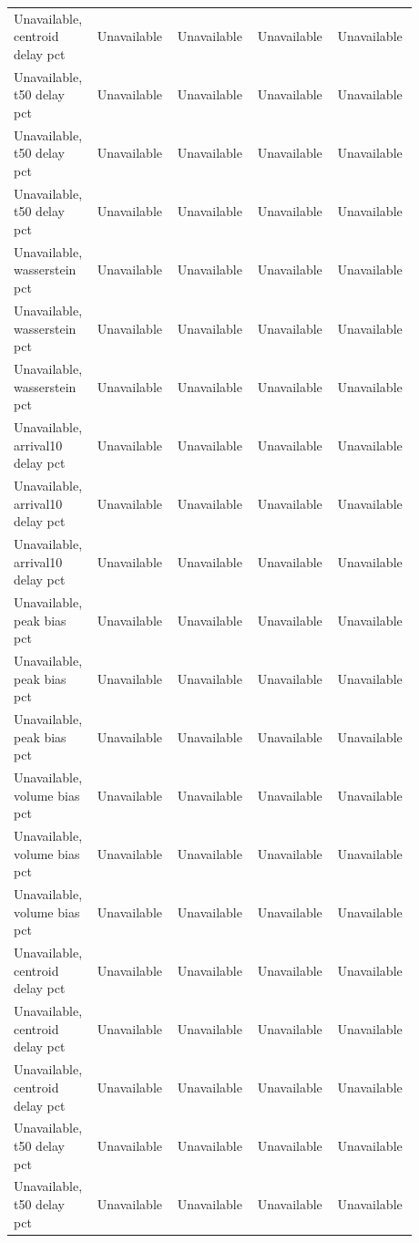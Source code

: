 \begin{longtable}{p{0.1760\linewidth}p{0.1760\linewidth}p{0.1760\linewidth}p{0.1760\linewidth}p{0.1760\linewidth}}
Unavailable, centroid delay pct & Unavailable & Unavailable & Unavailable & Unavailable \\
Unavailable, t50 delay pct & Unavailable & Unavailable & Unavailable & Unavailable \\
Unavailable, t50 delay pct & Unavailable & Unavailable & Unavailable & Unavailable \\
Unavailable, t50 delay pct & Unavailable & Unavailable & Unavailable & Unavailable \\
Unavailable, wasserstein pct & Unavailable & Unavailable & Unavailable & Unavailable \\
Unavailable, wasserstein pct & Unavailable & Unavailable & Unavailable & Unavailable \\
Unavailable, wasserstein pct & Unavailable & Unavailable & Unavailable & Unavailable \\
Unavailable, arrival10 delay pct & Unavailable & Unavailable & Unavailable & Unavailable \\
Unavailable, arrival10 delay pct & Unavailable & Unavailable & Unavailable & Unavailable \\
Unavailable, arrival10 delay pct & Unavailable & Unavailable & Unavailable & Unavailable \\
Unavailable, peak bias pct & Unavailable & Unavailable & Unavailable & Unavailable \\
Unavailable, peak bias pct & Unavailable & Unavailable & Unavailable & Unavailable \\
Unavailable, peak bias pct & Unavailable & Unavailable & Unavailable & Unavailable \\
Unavailable, volume bias pct & Unavailable & Unavailable & Unavailable & Unavailable \\
Unavailable, volume bias pct & Unavailable & Unavailable & Unavailable & Unavailable \\
Unavailable, volume bias pct & Unavailable & Unavailable & Unavailable & Unavailable \\
Unavailable, centroid delay pct & Unavailable & Unavailable & Unavailable & Unavailable \\
Unavailable, centroid delay pct & Unavailable & Unavailable & Unavailable & Unavailable \\
Unavailable, centroid delay pct & Unavailable & Unavailable & Unavailable & Unavailable \\
Unavailable, t50 delay pct & Unavailable & Unavailable & Unavailable & Unavailable \\
Unavailable, t50 delay pct & Unavailable & Unavailable & Unavailable & Unavailable \\

\end{longtable}
